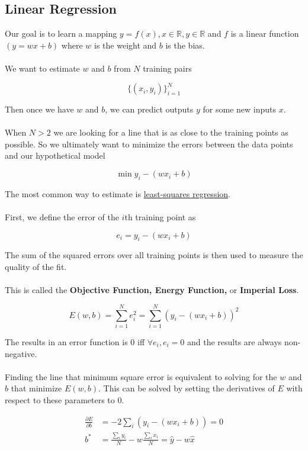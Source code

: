 \documentclass[12pt]{article}
\begin{document}
\subsection{Linear Regression}

Our goal is to learn a mapping $y=f(x), x\in\mathbb{R}, y\in\mathbb{R}$ and $f$ is a linear function $(y = w x + b)$ where $w$ is the weight and $b$ is the bias.
\\
\\
We want to estimate $w$ and $b$ from $N$ training pairs

$$\{(x_i, y_i)\}^N_{i=1}$$

Then once we have $w$ and $b$, we can predict outputs $y$ for some new inputs $x$.
\\
\\
When $N > 2$ we are looking for a line that is as close to the training points as possible. So we ultimately want to minimize the errors between the data points and our hypothetical model

$$\min y_i - (wx_i + b)$$

The most common way to estimate is \underline{least-squares regression}.
\\
\\
First, we define the error of the $i$th training point as

$$e_i = y_i - (wx_i +b)$$

The sum of the squared errors over all training points is then used to measure the quality of the fit.\\
\\
This is called the \textbf{Objective Function, Energy Function,} or \textbf{Imperial Loss}.

$$E(w,b) = \sum^N_{i=1} e_i^2 = \sum^N_{i=1} (y_i - (wx_i + b))^2$$

The results in an error function is 0 iff $\forall e_i, e_i = 0$ and the results are always non-negative.
\\
\\
Finding the line that minimum square error is equivalent to solving for the $w$ and $b$ that minimize $E(w,b)$. This can be solved by setting the derivatives of $E$ with respect to these parameters to 0.

\begin{align*}
     \frac{\partial E}{\partial b} &= -2 \sum_i (y_i - (wx_i + b)) = 0\\
     b^* &=  \frac{\sum_i y_i}{N} - w \frac{\sum_i x_i}{N} = \hat{y} - w \hat{x}
\end{align*}
\end{document}

